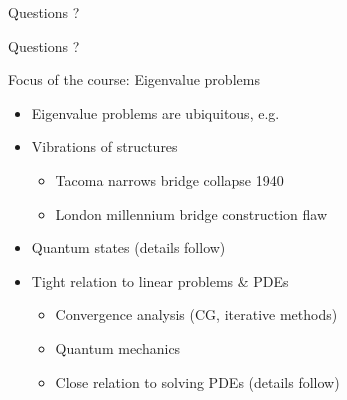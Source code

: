 \begin{frame}{Questions ?}
    \begin{center}
        \huge{Questions ?}
    \end{center}
\end{frame}

\begin{frame}{Focus of the course: Eigenvalue problems}
    \begin{itemize}
        \item Eigenvalue problems are ubiquitous, e.g.
        \vspace{2em}
        \item \alert{Vibrations of structures}
            \begin{itemize}
                \item Tacoma narrows bridge collapse 1940
                \item London millennium bridge construction flaw
            \end{itemize}
        \vspace{1em}
        \item \alert{Quantum states} \textcolor{grey5}{\smaller (details follow)}
        \vspace{1em}
        \item Tight relation to \alert{linear problems \& PDEs}
            \begin{itemize}
                \item Convergence analysis (CG, iterative methods)
                \item Quantum mechanics
                \item Close relation to solving PDEs
                    \textcolor{grey5}{\smaller (details follow)}
            \end{itemize}
    \end{itemize}
\end{frame}
